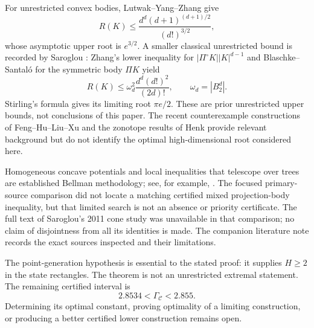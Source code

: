 \documentclass[11pt]{article}
\theoremstyle{remark}
\newcommand{\CC}{\mathcal C}
\begin{document}
For unrestricted convex bodies, Lutwak--Yang--Zhang \cite{lyz} give
\[
 R(K)\le\frac{d^d(d+1)^{(d+1)/2}}{(d!)^{3/2}},
\]
whose asymptotic upper root is $e^{3/2}$. A smaller classical unrestricted bound is recorded by Saroglou \cite{saroglou2015}: Zhang's lower inequality for $|\Pi^\circ K||K|^{d-1}$ and Blaschke--Santal\'o for the symmetric body $\Pi K$ yield
\[
 R(K)\le\omega_d^2\frac{d^d(d!)^2}{(2d)!},
 \qquad\omega_d=|B_2^d|.
\]
Stirling's formula gives its limiting root $\pi e/2$. These are prior unrestricted upper bounds, not conclusions of this paper. The recent counterexample constructions of Feng--Hu--Liu--Xu \cite{fhlx} and the zonotope results of Henk \cite{henk} provide relevant background but do not identify the optimal high-dimensional root considered here.

Homogeneous concave potentials and local inequalities that telescope over trees are established Bellman methodology; see, for example, \cite{tree,hessian,isoperimetric}. The focused primary-source comparison did not locate a matching certified mixed projection-body inequality, but that limited search is not an absence or priority certificate. The full text of Saroglou's 2011 cone study \cite{saroglou2011} was unavailable in that comparison; no claim of disjointness from all its identities is made. The companion literature note records the exact sources inspected and their limitations.

The point-generation hypothesis is essential to the stated proof: it supplies $H\ge2$ in the state rectangles. The theorem is not an unrestricted extremal statement. The remaining certified interval is
\[
 2.8534<\Gamma_{\CC}<2.855.
\]
Determining its optimal constant, proving optimality of a limiting construction, or producing a better certified lower construction remains open.
\end{document}
